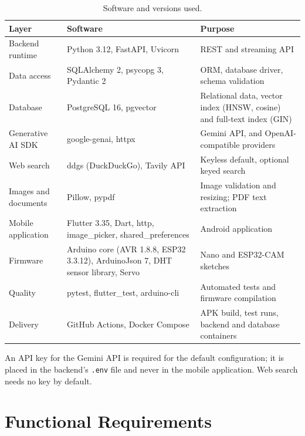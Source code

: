 \begin{table}[H]
\centering
\caption{Software and versions used.}
\label{tab:sw}
\small
\begin{tabular}{|P{3.2cm}|P{3.4cm}|P{6.2cm}|}
\hline
\textbf{Layer} & \textbf{Software} & \textbf{Purpose}\\\hline
Backend runtime & Python 3.12, FastAPI, Uvicorn~\cite{fastapi} & REST and streaming API\\\hline
Data access & SQLAlchemy 2, psycopg 3, Pydantic 2 & ORM, database driver, schema validation\\\hline
Database & PostgreSQL 16, pgvector~\cite{pgvector} & Relational data, vector index (HNSW, cosine) and full-text index (GIN)\\\hline
Generative AI SDK & google-genai, httpx & Gemini API, and OpenAI-compatible providers~\cite{geminiapi}\\\hline
Web search & ddgs (DuckDuckGo), Tavily API & Keyless default, optional keyed search~\cite{tavily}\\\hline
Images and documents & Pillow, pypdf & Image validation and resizing; PDF text extraction\\\hline
Mobile application & Flutter 3.35, Dart, http, image\_picker, shared\_preferences & Android application~\cite{flutter}\\\hline
Firmware & Arduino core (AVR 1.8.8, ESP32 3.3.12), ArduinoJson 7, DHT sensor library, Servo & Nano and ESP32-CAM sketches\\\hline
Quality & pytest, flutter\_test, arduino-cli & Automated tests and firmware compilation\\\hline
Delivery & GitHub Actions, Docker Compose & APK build, test runs, backend and database containers\\\hline
\end{tabular}
\end{table}

An API key for the Gemini API is required for the default configuration; it is placed in the backend's \texttt{.env} file and never
in the mobile application. Web search needs no key by default.

\section{Functional Requirements}

